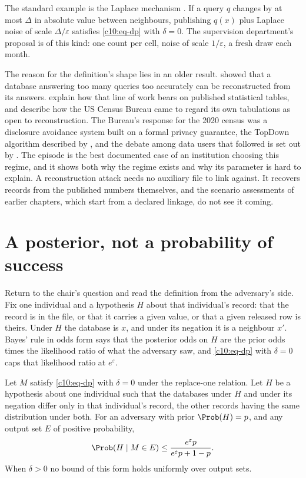 The standard example is the Laplace mechanism \citep{dwork2006b}. If a query $q$
changes by at most $\Delta$ in absolute value between neighbours, publishing
$q(x)$ plus Laplace noise of scale $\Delta/\varepsilon$ satisfies
\eqref{c10:eq-dp} with $\delta = 0$. The supervision department's proposal is of
this kind: one count per cell, noise of scale $1/\varepsilon$, a fresh draw each
month.

The reason for the definition's shape lies in an older result. \citet{dinur2003}
showed that a database answering too many queries too accurately can be
reconstructed from its answers. \citet{garfinkel2019} explain how that line of
work bears on published statistical tables, and describe how the US Census Bureau
came to regard its own tabulations as open to reconstruction. The Bureau's
response for the 2020 census was a disclosure avoidance system built on a formal
privacy guarantee, the TopDown algorithm described by \citet{abowd2022}, and the
debate among data users that followed is set out by \citet{hotz2022}. The episode
is the best documented case of an institution choosing this regime, and it shows
both why the regime exists and why its parameter is hard to explain. A
reconstruction attack needs no auxiliary file to link against. It recovers
records from the published numbers themselves, and the scenario assessments of
earlier chapters, which start from a declared linkage, do not see it coming.

\section{A posterior, not a probability of success}\label{c10:sec-posterior}

Return to the chair's question and read the definition from the adversary's side.
Fix one individual and a hypothesis $H$ about that individual's record: that the
record is in the file, or that it carries a given value, or that a given released
row is theirs. Under $H$ the database is $x$, and under its negation it is a
neighbour $x'$. Bayes' rule in odds form says that the posterior odds on $H$ are
the prior odds times the likelihood ratio of what the adversary saw, and
\eqref{c10:eq-dp} with $\delta = 0$ caps that likelihood ratio at $e^\varepsilon$.

\begin{proposition}\label{c10:prop-post}
Let $M$ satisfy \eqref{c10:eq-dp} with $\delta = 0$ under the replace-one relation.
Let $H$ be a hypothesis about one individual such that the databases under $H$ and
under its negation differ only in that individual's record, the other records
having the same distribution under both. For an adversary with prior
$\Prob(H) = p$, and any output set $E$ of positive probability,
\begin{equation}\label{c10:eq-post}
\Prob(H \mid M \in E) \le \frac{e^{\varepsilon} p}{e^{\varepsilon} p + 1 - p}.
\end{equation}
When $\delta > 0$ no bound of this form holds uniformly over output sets.
\end{proposition}

